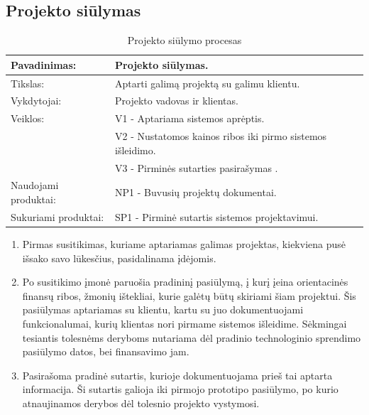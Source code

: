 \documentclass{VUMIFPSkursinis}
\begin{document}
	\subsection{Projekto siūlymas}

	\begin{center}
		\begin{table}[ht]
			\caption{Projekto siūlymo procesas}
		\begin{tabular}{ | l | l | } 
		\hline
	Pavadinimas:         & Projekto siūlymas.                                      \\ \hline
	Tikslas: 	           & Aptarti galimą projektą su galimu klientu. 							\\ \hline
	Vykdytojai:          & Projekto vadovas ir klientas.                             \\ \hline
	Veiklos:             & V1 - Aptariama sistemos aprėptis. 													\\
											 & V2 - Nustatomos kainos ribos iki pirmo sistemos išleidimo.  \\
											 & V3 - Pirminės sutarties pasirašymas .													\\ \hline
	Naudojami produktai: & NP1 - Buvusių projektų dokumentai. 													 \\ \hline
	Sukuriami produktai: & SP1 - Pirminė sutartis sistemos projektavimui. 								\\ \hline
\end{tabular}
\end{table}
\end{center}
\begin{enumerate}
	\item Pirmas susitikimas, kuriame aptariamas galimas projektas, kiekviena pusė išsako savo lūkesčius, pasidalinama įdėjomis.
	\item Po susitikimo įmonė paruošia pradininį pasiūlymą, į kurį įeina orientacinės finansų ribos, žmonių ištekliai, kurie galėtų būtų skiriami šiam projektui. Šis pasiūlymas aptariamas su klientu, kartu su juo dokumentuojami funkcionalumai, kurių klientas nori pirmame sistemos išleidime. Sėkmingai tesiantis tolesnėms deryboms nutariama dėl pradinio technologinio sprendimo pasiūlymo datos, bei finansavimo jam.
	\item Pasirašoma pradinė sutartis, kurioje dokumentuojama prieš tai aptarta informacija. Ši sutartis galioja iki pirmojo prototipo pasiūlymo, po kurio atnaujinamos derybos dėl tolesnio projekto vystymosi.
\end{enumerate}
\end{document}
